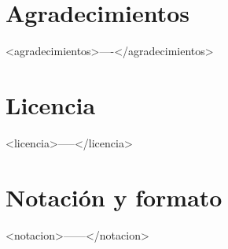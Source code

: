 \section*{Agradecimientos}

<agradecimientos>----</agradecimientos>

\cleardoublepage

\section*{Licencia}

<licencia>-----</licencia>

\cleardoublepage

\section*{Notación y formato}

<notacion>------</notacion>
